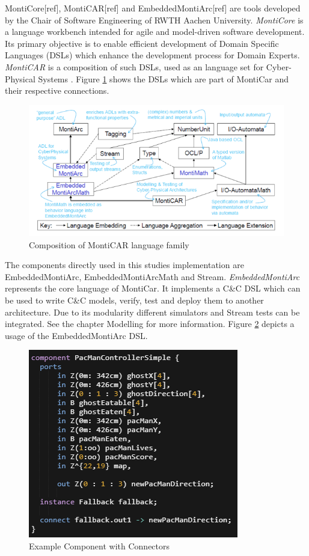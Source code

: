 MontiCore[ref], MontiCAR[ref] and EmbeddedMontiArc[ref] are tools developed by the Chair of Software Engineering of RWTH Aachen University\cite{serwth}.
\emph{MontiCore} is a language workbench intended for agile and model-driven software development. Its primary objective is to enable efficient development of Domain Specific Languages (DSLs) which enhance the development process for Domain Experts. 
\emph{MontiCAR} is a composition of such DSLs, used as an language set for Cyber-Physical Systems \cite{seminarArmin}. Figure \ref{fig:MontiCAR} shows the DSLs which are part of MontiCar and their respective connections.
\begin{figure}
	\centering
	\includegraphics[scale=0.55]{pictures/MontiCarOverview.PNG}
	\caption{Composition of MontiCAR language family\cite{seminarArmin}}
	\label{fig:MontiCAR}
\end{figure}
The components directly used in this studies implementation are EmbeddedMontiArc, EmbeddedMontiArcMath and Stream.
\emph{EmbeddedMontiArc} represents the core language of MontiCar. It implements a C\&C DSL which can be used to write C\&C models, verify, test and deploy them to another architecture. Due to its modularity different simulators and Stream tests can be integrated. See the chapter Modelling for more information. Figure \ref{fig:EMontiArc} depicts a usage of the EmbeddedMontiArc DSL.

\begin{figure}[!h]
	\centering
	\includegraphics[scale=0.70]{pictures/EMA.PNG}
	\caption{Example Component with Connectors}
	\label{fig:EMontiArc}
\end{figure}

